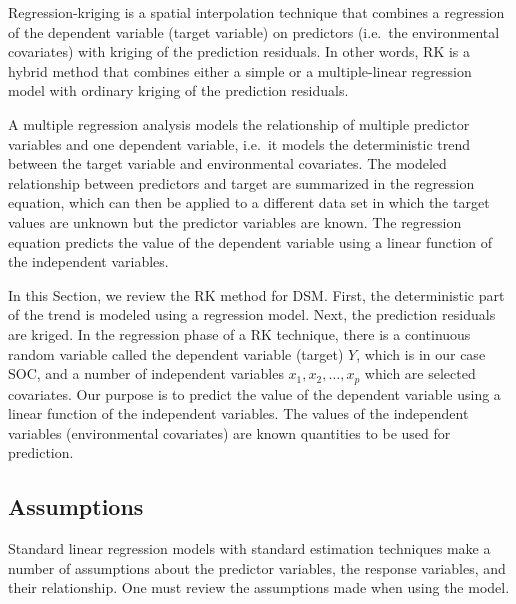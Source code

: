 \documentclass[10pt,b5paper,]{book}
\theoremstyle{definition}
\theoremstyle{definition}
\theoremstyle{definition}
\theoremstyle{remark}
\begin{document}
Regression-kriging is a spatial interpolation technique that combines a
regression of the dependent variable (target variable) on predictors
(i.e.~the environmental covariates) with kriging of the prediction
residuals. In other words, RK is a hybrid method that combines either a
simple or a multiple-linear regression model with ordinary kriging of
the prediction residuals.

A multiple regression analysis models the relationship of multiple
predictor variables and one dependent variable, i.e.~it models the
deterministic trend between the target variable and environmental
covariates. The modeled relationship between predictors and target are
summarized in the regression equation, which can then be applied to a
different data set in which the target values are unknown but the
predictor variables are known. The regression equation predicts the
value of the dependent variable using a linear function of the
independent variables.

In this Section, we review the RK method for DSM. First, the
deterministic part of the trend is modeled using a regression model.
Next, the prediction residuals are kriged. In the regression phase of a
RK technique, there is a continuous random variable called the dependent
variable (target) \(Y\), which is in our case SOC, and a number of
independent variables \({x_1, x_2,\dots,x_p}\) which are selected
covariates. Our purpose is to predict the value of the dependent
variable using a linear function of the independent variables. The
values of the independent variables (environmental covariates) are known
quantities to be used for prediction.

\hypertarget{assumptions}{%
\subsection{Assumptions}\label{assumptions}}

Standard linear regression models with standard estimation techniques
make a number of assumptions 
about the predictor variables, the response variables, and their
relationship. One must review the assumptions made when using the model.
\end{document}
